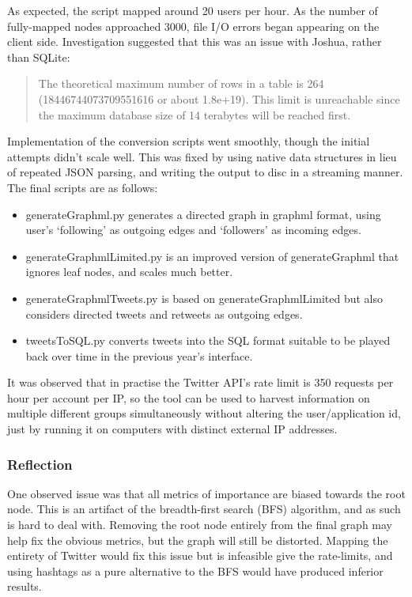 As expected, the script mapped around 20 users per hour. As the number of fully-mapped nodes approached 3000, file I/O errors began appearing on the client side. Investigation suggested that this was an issue with Joshua, rather than SQLite:

\begin{quote}
The theoretical maximum number of rows in a table is 264 (18446744073709551616 or about 1.8e+19). This limit is unreachable since the maximum database size of 14 terabytes will be reached first.
\end{quote}
\cite{sqliteLimits}

Implementation of the conversion scripts went smoothly, though the initial attempts didn't scale well. This was fixed by using native data structures in lieu of repeated JSON parsing, and writing the output to disc in a streaming manner. The final scripts are as follows:
\begin{itemize}
\item generateGraphml.py generates a directed graph in graphml format, using user's ‘following' as outgoing edges and ‘followers' as incoming edges.
\item generateGraphmlLimited.py is an improved version of generateGraphml that ignores leaf nodes, and scales much better.
\item generateGraphmlTweets.py is based on generateGraphmlLimited but also considers directed tweets and retweets as outgoing edges.
\item tweetsToSQL.py converts tweets into the SQL format suitable to be played back over time in the previous year's interface.
\end{itemize}

It was observed that in practise the Twitter API's rate limit is 350 requests per hour per account per IP, so the tool can be used to harvest information on multiple different groups simultaneously without altering the user/application id, just by running it on computers with distinct external IP addresses.

\subsubsection{Reflection}
One observed issue was that all metrics of importance are biased towards the root node. This is an artifact of the breadth-first search (BFS) algorithm, and as such is hard to deal with. Removing the root node entirely from the final graph may help fix the obvious metrics, but the graph will still be distorted. Mapping the entirety of Twitter would fix this issue but is infeasible give the rate-limits, and using hashtags as a pure alternative to the BFS would have produced inferior results.

